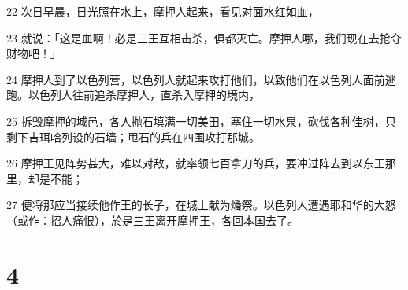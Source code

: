 \par 22 次日早晨，日光照在水上，摩押人起来，看见对面水红如血，
\par 23 就说：「这是血啊！必是三王互相击杀，俱都灭亡。摩押人哪，我们现在去抢夺财物吧！」
\par 24 摩押人到了以色列营，以色列人就起来攻打他们，以致他们在以色列人面前逃跑。以色列人往前追杀摩押人，直杀入摩押的境内，
\par 25 拆毁摩押的城邑，各人抛石填满一切美田，塞住一切水泉，砍伐各种佳树，只剩下吉珥哈列设的石墙；甩石的兵在四围攻打那城。
\par 26 摩押王见阵势甚大，难以对敌，就率领七百拿刀的兵，要冲过阵去到以东王那里，却是不能；
\par 27 便将那应当接续他作王的长子，在城上献为燔祭。以色列人遭遇耶和华的大怒（或作：招人痛恨），於是三王离开摩押王，各回本国去了。

\chapter{4}


